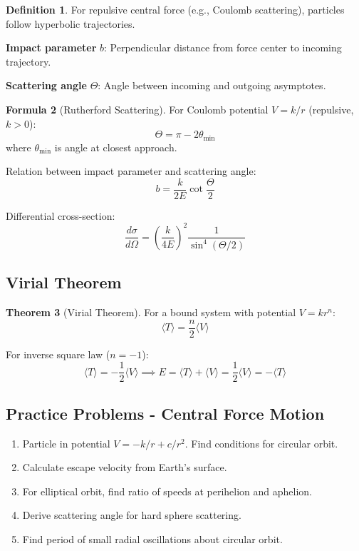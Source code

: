 \documentclass[12pt,a4paper]{article}
\theoremstyle{definition}
\newtheorem{theorem}{Theorem}[section]
\newtheorem{definition}[theorem]{Definition}
\newtheorem{formula}[theorem]{Formula}
\begin{document}
\begin{definition}
For repulsive central force (e.g., Coulomb scattering), particles follow hyperbolic trajectories.

\textbf{Impact parameter} $b$: Perpendicular distance from force center to incoming trajectory.

\textbf{Scattering angle} $\Theta$: Angle between incoming and outgoing asymptotes.
\end{definition}

\begin{formula}[Rutherford Scattering]
For Coulomb potential $V = k/r$ (repulsive, $k > 0$):
\[
\Theta = \pi - 2\theta_{\min}
\]
where $\theta_{\min}$ is angle at closest approach.

Relation between impact parameter and scattering angle:
\[
b = \frac{k}{2E}\cot\frac{\Theta}{2}
\]

Differential cross-section:
\[
\frac{d\sigma}{d\Omega} = \left(\frac{k}{4E}\right)^2 \frac{1}{\sin^4(\Theta/2)}
\]
\end{formula}

\subsection{Virial Theorem}

\begin{theorem}[Virial Theorem]
For a bound system with potential $V = kr^n$:
\[
\langle T \rangle = \frac{n}{2}\langle V \rangle
\]

For inverse square law ($n = -1$):
\[
\langle T \rangle = -\frac{1}{2}\langle V \rangle \implies E = \langle T \rangle + \langle V \rangle = \frac{1}{2}\langle V \rangle = -\langle T \rangle
\]
\end{theorem}

\subsection{Practice Problems - Central Force Motion}

\begin{enumerate}
    \item Particle in potential $V = -k/r + c/r^2$. Find conditions for circular orbit.
    
    \item Calculate escape velocity from Earth's surface.
    
    \item For elliptical orbit, find ratio of speeds at perihelion and aphelion.
    
    \item Derive scattering angle for hard sphere scattering.
    
    \item Find period of small radial oscillations about circular orbit.
\end{enumerate}
\end{document}
